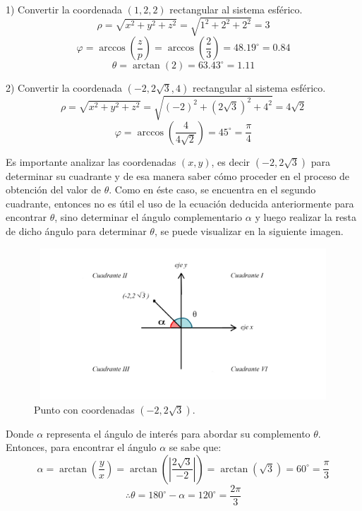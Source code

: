 1) Convertir la coordenada ${\left(1,2,2\right)}$ rectangular al sistema esférico.
\[\rho = \sqrt{x^{2}+y^{2}+z^{2}} = \sqrt{1^{2}+2^{2}+2^{2}} = 3\]
\[\varphi = \arccos\left(\frac{z}{p}\right) = \arccos\left(\frac{2}{3}\right) = 48.19^{\circ} = 0.84\]
\[\theta = \arctan\left(2\right) = 63.43^{\circ} = 1.11\]

\vspace{4mm}
2) Convertir la coordenada ${\left(-2,2\sqrt{3},4\right)}$ rectangular al sistema esférico.
\[\rho = \sqrt{x^{2}+y^{2}+z^{2}} = \sqrt{(-2)^2+(2\sqrt{3})^{2}+4^{2}} = 4 \sqrt{2}\]
\[\varphi = \arccos\left(\frac{4}{4\sqrt{2}}\right) = 45^{\circ} = \frac{\pi}{4}\]

\vspace{4mm}
Es importante analizar las coordenadas ${\left(x,y\right)}$, es decir ${\left(-2,2\sqrt{3}\right)}$ para determinar su cuadrante y de esa manera saber cómo proceder en el proceso de obtención del valor de ${\theta}$. Como en éste caso, se encuentra en el segundo cuadrante, entonces no es útil el uso de la ecuación deducida anteriormente para encontrar ${\theta}$, sino determinar el ángulo complementario ${\alpha}$ y luego realizar la resta de dicho ángulo para determinar ${\theta}$, se puede visualizar en la siguiente imagen.

\begin{figure}[H]
  \centering
  \includegraphics[width=11.17cm, height=5.67cm]{img/graph/segundo_cuadrante.jpg}
  \caption{Punto con coordenadas ${(-2,2\sqrt{3})}$.}
\end{figure}

Donde ${\alpha}$ representa el ángulo de interés para abordar su complemento ${\theta}$. Entonces, para encontrar el ángulo ${\alpha}$ se sabe que:
\[\alpha = \arctan\left(\frac{y}{x}\right) = \arctan \left( \left|\frac{2\sqrt{3}}{-2} \right| \right) = \arctan(\sqrt{3}) = 60^{\circ} = \frac{\pi}{3} \]
\[\therefore \theta = 180^{\circ} - \alpha = 120^{\circ} =\frac{2\pi}{3}\]

